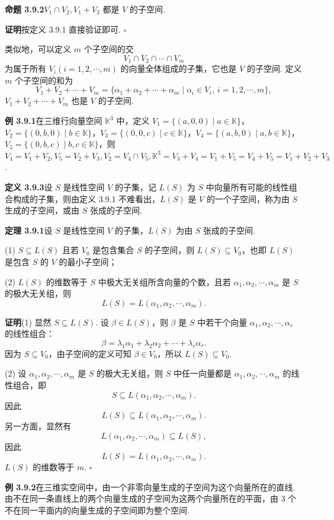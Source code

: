 \documentclass[UTF8, 12pt, fontset=fandol, oneside]{ctexart}
\begin{document}
\noindent\textbf{命题 3.9.2}\quad $V_1\cap V_2,V_1+V_2$ 都是 $V$ 的子空间.

\noindent\textbf{证明}\quad 按定义 3.9.1 直接验证即可. $\square$

类似地，可以定义 $m$ 个子空间的交
\[
V_1\cap V_2\cap\cdots\cap V_m
\]
为属于所有 $V_i(i=1,2,\cdots,m)$ 的向量全体组成的子集，它也是 $V$ 的子空间. 定义 $m$ 个子空间的和为
\[
V_1+V_2+\cdots+V_m=\{\alpha_1+\alpha_2+\cdots+\alpha_m\mid \alpha_i\in V_i,\ i=1,2,\cdots,m\},
\]
$V_1+V_2+\cdots+V_m$ 也是 $V$ 的子空间.

\noindent\textbf{例 3.9.1}\quad 在三维行向量空间 $\mathbb{K}^3$ 中，定义 $V_1=\{(a,0,0)\mid a\in\mathbb{K}\}$，$V_2=\{(0,b,0)\mid b\in\mathbb{K}\}$，$V_3=\{(0,0,c)\mid c\in\mathbb{K}\}$，$V_4=\{(a,b,0)\mid a,b\in\mathbb{K}\}$，$V_5=\{(0,b,c)\mid b,c\in\mathbb{K}\}$，则 $V_4=V_1+V_2,V_5=V_2+V_3,V_2=V_4\cap V_5,\mathbb{K}^3=V_3+V_4=V_1+V_5=V_4+V_5=V_1+V_2+V_3$.

\noindent\textbf{定义 3.9.3}\quad 设 $S$ 是线性空间 $V$ 的子集，记 $L(S)$ 为 $S$ 中向量所有可能的线性组合构成的子集，则由定义 3.9.1 不难看出，$L(S)$ 是 $V$ 的一个子空间，称为由 $S$ 生成的子空间，或由 $S$ 张成的子空间.

\noindent\textbf{定理 3.9.1}\quad 设 $S$ 是线性空间 $V$ 的子集，$L(S)$ 为由 $S$ 张成的子空间.

(1) $S\subseteq L(S)$ 且若 $V_0$ 是包含集合 $S$ 的子空间，则 $L(S)\subseteq V_0$，也即 $L(S)$ 是包含 $S$ 的 $V$ 的最小子空间；

(2) $L(S)$ 的维数等于 $S$ 中极大无关组所含向量的个数，且若 $\alpha_1,\alpha_2,\cdots,\alpha_m$ 是 $S$ 的极大无关组，则
\[
L(S)=L(\alpha_1,\alpha_2,\cdots,\alpha_m).
\]

\noindent\textbf{证明}\quad (1) 显然 $S\subseteq L(S)$. 设 $\beta\in L(S)$，则 $\beta$ 是 $S$ 中若干个向量 $\alpha_1,\alpha_2,\cdots,\alpha_r$ 的线性组合：
\[
\beta=\lambda_1\alpha_1+\lambda_2\alpha_2+\cdots+\lambda_r\alpha_r.
\]
因为 $S\subseteq V_0$，由子空间的定义可知 $\beta\in V_0$，所以 $L(S)\subseteq V_0$.

(2) 设 $\alpha_1,\alpha_2,\cdots,\alpha_m$ 是 $S$ 的极大无关组，则 $S$ 中任一向量都是 $\alpha_1,\alpha_2,\cdots,\alpha_m$ 的线性组合，即
\[
S\subseteq L(\alpha_1,\alpha_2,\cdots,\alpha_m).
\]
因此
\[
L(S)\subseteq L(\alpha_1,\alpha_2,\cdots,\alpha_m).
\]
另一方面，显然有
\[
L(\alpha_1,\alpha_2,\cdots,\alpha_m)\subseteq L(S),
\]
因此
\[
L(S)=L(\alpha_1,\alpha_2,\cdots,\alpha_m).
\]
$L(S)$ 的维数等于 $m$. $\square$

\noindent\textbf{例 3.9.2}\quad 在三维实空间中，由一个非零向量生成的子空间为这个向量所在的直线. 由不在同一条直线上的两个向量生成的子空间为这两个向量所在的平面，由 3 个不在同一平面内的向量生成的子空间即为整个空间.
\end{document}
